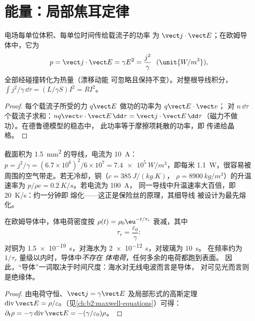 \section{能量：局部焦耳定律}

\begin{proposition}[局部焦耳定律]\label{prop:b2:charges-currents-conduction:joule}
电场每单位体积、每单位时间传给载流子的功率
为 $\vect j\cdot\vect E$；在欧姆导体中，它为
\[
p = \vect j\cdot\vect E = \gamma E^2 = \frac{j^2}\gamma \ \ (\unit{W/m^3}) ,
\]
全部经碰撞转化为热量（漂移动能
可忽略且保持不变）。对整根导线积分，$\int j^2/\gamma\,\dd\tau
= (L/\gamma S)I^2 = RI^2$。
\end{proposition}

\begin{proof}
每个载流子所受的力 $q\vect E$ 做功的功率为 $q\vect E\cdot\vect v$；
对 $n\,\dd\tau$ 个载流子求和：$nq\vect v\cdot\vect E\,\dd\tau = \vect j\cdot
\vect E\,\dd\tau$（磁力不做功）。在德鲁德模型的稳态中，
此功率等于摩擦项耗散的功率，即
传递给晶格。
\end{proof}

\begin{example}[导线发热]\label{ex:b2:charges-currents-conduction:heating}
截面积为 \qty{1.5}{mm^2} 的导线，电流为 \qty{10}{A}：$p = j^2/\gamma = (6.7 \times 10^6)^2/6 \times 10^7 =
\qty{7.4e5}{W/m^3}$，即每米 \qty{1.1}{W}，很容易被
周围的空气带走。若无冷却，铜（$c = \qty{385}{J/(kg.K)}$，
$\rho = \qty{8900}{kg/m^3}$）的升温速率为 $p/\rho c = \qty{0.2}{K/s}$。若电流为 \qty{100}{A}，
同一导线中升温速率大百倍，即 \qty{20}{K/s}：约一分钟即
熔化——这正是保险丝的原理，其细导线
被设计为最先熔化。
\end{example}

\begin{proposition}[导体中电荷的弛豫]\label{prop:b2:charges-currents-conduction:relaxation}
在欧姆导体中，体电荷密度按 $\rho(t) =
\rho_0\eu^{-t/\tau_r}$ 衰减，其中
\[
\tau_r = \frac{\varepsilon_0}{\gamma} :
\]
对铜为 \qty{1.5e-19}{s}，对海水为 \qty{2e-12}{s}，对玻璃为 \qty{10}{s}。
在频率约为 $1/\tau_r$ 量级以内时，导体中\emph{不存在
体电荷}，任何多余的电荷都跑到表面。
因此，“导体”一词取决于时间尺度：海水对无线电波而言是导体，
对可见光而言则是绝缘体。
\end{proposition}

\begin{proof}
由电荷守恒、$\vect j = \gamma\vect E$ 及局部形式的高斯定理
$\operatorname{div}\vect E = \rho/\varepsilon_0$（见\cref{ch:b2:maxwell-equations}）可得：
$\partial_t\rho = -\gamma\operatorname{div}\vect E = -(\gamma/\varepsilon_0)\rho$。
\end{proof}

